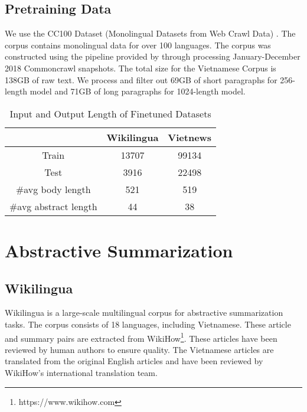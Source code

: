 \documentclass[11pt,a4paper]{article}
\begin{document}
\subsection{Pretraining Data}
We use the CC100 Dataset (Monolingual Datasets from Web Crawl Data) \cite{ccnet, conneau-etal-2020-unsupervised}. The corpus contains monolingual data for over 100 languages. The corpus was constructed using the pipeline provided by \cite{ccnet} through processing January-December 2018 Commoncrawl snapshots. The total size for the Vietnamese Corpus is 138GB of raw text. We process and filter out 69GB of short paragraphs for 256-length model and 71GB of long paragraphs for 1024-length model.

 \begin{table}[hbt!]
\centering
\caption{Input and Output Length of Finetuned Datasets}
\begin{tabular}{|c|c|l|l|c|l|l}
\hline
\multicolumn{1}{|l|}{}               & \multicolumn{3}{c|}{Wikilingua}          & \multicolumn{3}{c|}{Vietnews}                                    \\ \hline
Train     & \multicolumn{3}{c|}{13707}                 & \multicolumn{3}{c|}{99134}                                         \\ \hline
Test     & \multicolumn{3}{c|}{3916}                 & \multicolumn{3}{c|}{22498}                                         \\ \hline
\#avg body length     & \multicolumn{3}{c|}{521}                 & \multicolumn{3}{c|}{519}                                         \\ \hline
\#avg abstract length & \multicolumn{3}{c|}{44}                  & \multicolumn{3}{c|}{38}                                          \\ \hline
\end{tabular}
\label{data}
\end{table} 



\section{Abstractive Summarization}
\subsection{Wikilingua}
Wikilingua \cite{wikilingual} is a large-scale multilingual corpus for abstractive summarization tasks. The corpus consists of 18 languages, including Vietnamese. These article and summary pairs are extracted from WikiHow\footnote{https://www.wikihow.com}. These articles have been reviewed by human authors to ensure quality. The Vietnamese articles are translated from the original English articles and have been reviewed by WikiHow's international translation team.
\end{document}

